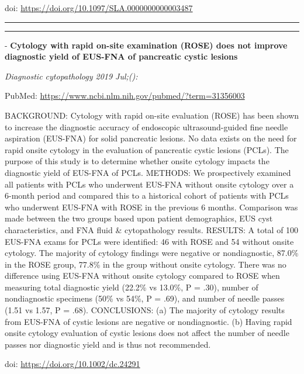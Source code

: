 \documentclass[]{article}
\begin{document}
doi: \url{https://doi.org/10.1097/SLA.0000000000003487}

{}

{}

\begin{center}\rule{0.5\linewidth}{\linethickness}\end{center}

\begin{center}\rule{0.5\linewidth}{\linethickness}\end{center}

 - \textbf{Cytology with rapid on-site examination (ROSE) does not
improve diagnostic yield of EUS-FNA of pancreatic cystic lesions}

\emph{Diagnostic cytopathology 2019 Jul;():}

PubMed: \url{https://www.ncbi.nlm.nih.gov/pubmed/?term=31356003}

BACKGROUND: Cytology with rapid on-site evaluation (ROSE) has been shown
to increase the diagnostic accuracy of endoscopic ultrasound-guided fine
needle aspiration (EUS-FNA) for solid pancreatic lesions. No data exists
on the need for rapid onsite cytology in the evaluation of pancreatic
cystic lesions (PCLs). The purpose of this study is to determine whether
onsite cytology impacts the diagnostic yield of EUS-FNA of PCLs.
METHODS: We prospectively examined all patients with PCLs who underwent
EUS-FNA without onsite cytology over a 6-month period and compared this
to a historical cohort of patients with PCLs who underwent EUS-FNA with
ROSE in the previous 6 months. Comparison was made between the two
groups based upon patient demographics, EUS cyst characteristics, and
FNA fluid \& cytopathology results. RESULTS: A total of 100 EUS-FNA
exams for PCLs were identified: 46 with ROSE and 54 without onsite
cytology. The majority of cytology findings were negative or
nondiagnostic, 87.0\% in the ROSE group, 77.8\% in the group without
onsite cytology. There was no difference using EUS-FNA without onsite
cytology compared to ROSE when measuring total diagnostic yield (22.2\%
vs 13.0\%, P = .30), number of nondiagnostic specimens (50\% vs 54\%, P
= .69), and number of needle passes (1.51 vs 1.57, P = .68).
CONCLUSIONS: (a) The majority of cytology results from EUS-FNA of cystic
lesions are negative or nondiagnostic. (b) Having rapid onsite cytology
evaluation of cystic lesions does not affect the number of needle passes
nor diagnostic yield and is thus not recommended.

doi: \url{https://doi.org/10.1002/dc.24291}
\end{document}
